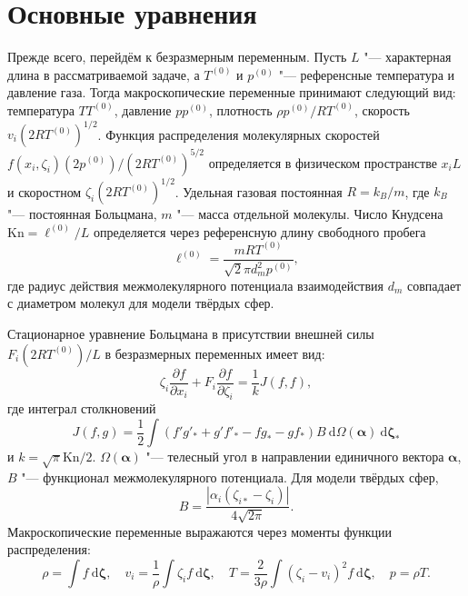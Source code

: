 \documentclass[10pt]{article}
\newcommand{\Kn}{\mathrm{Kn}}
\newcommand{\dd}{\:\mathrm{d}}
\newcommand{\pder}[2][]{\frac{\partial#1}{\partial#2}}
\newcommand{\dzeta}{\boldsymbol{\dd\zeta}}
\begin{document}
\section{Основные уравнения}

Прежде всего, перейдём к безразмерным переменным.
Пусть \(L\) "--- характерная длина в рассматриваемой задаче,
а \(T^{(0)}\) и \(p^{(0)}\) "--- референсные температура и давление газа.
Тогда макроскопические переменные принимают следующий вид:
температура \(TT^{(0)}\), давление \(pp^{(0)}\),
плотность \(\rho p^{(0)}/RT^{(0)}\), скорость \(v_i(2RT^{(0)})^{1/2}\).
Функция распределения молекулярных скоростей \(f(x_i,\zeta_i)(2p^{(0)})/(2RT^{(0)})^{5/2}\)
определяется в физическом пространстве \(x_iL\) и скоростном \(\zeta_i(2RT^{(0)})^{1/2}\).
Удельная газовая постоянная \(R = k_B/m\), где \(k_B\) "--- постоянная Больцмана,
\(m\) "--- масса отдельной молекулы.
Число Кнудсена \(\Kn = \ell^{(0)}/L\) определяется через референсную длину свободного пробега
\begin{equation}\label{eq:ell}
    \ell^{(0)} = \frac{mRT^{(0)}}{\sqrt2\pi d_m^2 p^{(0)}},
\end{equation}
где радиус действия межмолекулярного потенциала взаимодействия \(d_m\)
совпадает с диаметром молекул для модели твёрдых сфер.

Стационарное уравнение Больцмана в присутствии внешней силы \(F_i (2RT^{(0)})/L\) в безразмерных переменных имеет вид:
\begin{equation}\label{eq:Boltzmann}
    \zeta_i\pder[f]{x_i} + F_i\pder[f]{\zeta_i} = \frac1k J(f,f),
\end{equation}
где интеграл столкновений
\begin{equation}\label{eq:integral}
    J(f,g) = \frac12 \int(f'g'_*+g'f'_*-fg_*-gf_*)B\dd\Omega(\boldsymbol\alpha) \dzeta_*
\end{equation}
и \(k = \sqrt\pi\Kn/2\).
\(\Omega(\boldsymbol{\alpha})\) "--- телесный угол в направлении единичного вектора \(\boldsymbol\alpha\),
\(B\) "--- функционал межмолекулярного потенциала. Для модели твёрдых сфер,
\begin{equation}\label{eq:ci_kernel}
    B = \frac{|\alpha_i(\zeta_{i*}-\zeta_i)|}{4\sqrt{2\pi}}.
\end{equation}
Макроскопические переменные выражаются через моменты функции распределения:
\begin{equation}\label{eq:macro}
    \rho = \int f \dzeta, \quad
    v_i = \frac1{\rho} \int \zeta_i f \dzeta, \quad
    T = \frac{2}{3\rho}\int(\zeta_i-v_i)^2 f \dzeta, \quad
    p = \rho T.
\end{equation}
\end{document}
